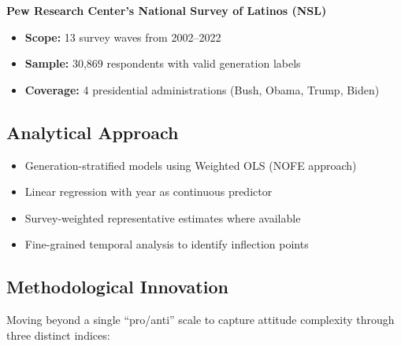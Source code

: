 \documentclass[11pt,letterpaper]{article}
\newcommand{\compactdesc}[2]{\item \textbf{#1:} #2}
\begin{document}
\textbf{Pew Research Center's National Survey of Latinos (NSL)}
\begin{itemize}
    \compactdesc{Scope}{13 survey waves from 2002--2022}
    \compactdesc{Sample}{30,869 respondents with valid generation labels}
    \compactdesc{Coverage}{4 presidential administrations (Bush, Obama, Trump, Biden)}
\end{itemize}

\subsection{Analytical Approach}
\begin{itemize}
    \item Generation-stratified models using Weighted OLS (NOFE approach)
    \item Linear regression with year as continuous predictor
    \item Survey-weighted representative estimates where available
    \item Fine-grained temporal analysis to identify inflection points
\end{itemize}

\subsection{Methodological Innovation}

Moving beyond a single ``pro/anti'' scale to capture attitude complexity through three distinct indices:
\end{document}
